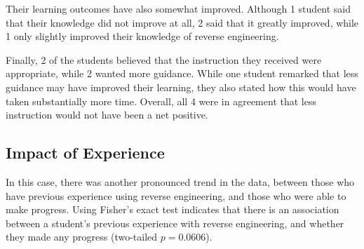             Their learning outcomes have also somewhat improved. 
            Although 1 student said that their knowledge did not improve at all, 2 said that it greatly improved, while 1 only slightly improved their knowledge of reverse engineering.

            Finally, 2 of the students believed that the instruction they received were appropriate, while 2 wanted more guidance. 
            While one student remarked that less guidance may have improved their learning, they also stated how this would have taken substantially more time. 
            Overall, all 4 were in agreement that less instruction would not have been a net positive. 

    \subsection{Impact of Experience}
        In this case, there was another pronounced trend in the data, between those who have previous experience using reverse engineering, and those who were able to make progress. 
        Using Fisher's exact test indicates that there is an association between a student's previous experience with reverse engineering, and whether they made any progress (two-tailed $p=0.0606$). 
                